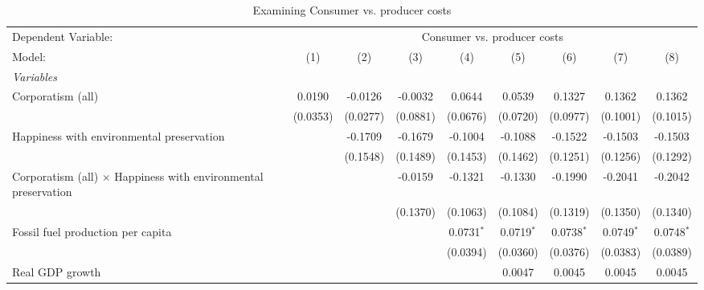 
\begin{table}[htbp]
   \caption{Examining Consumer vs. producer costs}
   \centering
   \begin{tabular}{lcccccccc}
      \tabularnewline \midrule \midrule
      Dependent Variable: & \multicolumn{8}{c}{Consumer vs. producer costs}\\
      Model:                                                                & (1)      & (2)      & (3)      & (4)          & (5)          & (6)          & (7)          & (8)\\  
      \midrule
      \emph{Variables}\\
      Corporatism (all)                                                     & 0.0190   & -0.0126  & -0.0032  & 0.0644       & 0.0539       & 0.1327       & 0.1362       & 0.1362\\   
                                                                            & (0.0353) & (0.0277) & (0.0881) & (0.0676)     & (0.0720)     & (0.0977)     & (0.1001)     & (0.1015)\\   
      Happiness with environmental preservation                             &          & -0.1709  & -0.1679  & -0.1004      & -0.1088      & -0.1522      & -0.1503      & -0.1503\\   
                                                                            &          & (0.1548) & (0.1489) & (0.1453)     & (0.1462)     & (0.1251)     & (0.1256)     & (0.1292)\\   
      Corporatism (all) $\times$ Happiness with environmental preservation  &          &          & -0.0159  & -0.1321      & -0.1330      & -0.1990      & -0.2041      & -0.2042\\   
                                                                            &          &          & (0.1370) & (0.1063)     & (0.1084)     & (0.1319)     & (0.1350)     & (0.1340)\\   
      Fossil fuel production per capita                                     &          &          &          & 0.0731$^{*}$ & 0.0719$^{*}$ & 0.0738$^{*}$ & 0.0749$^{*}$ & 0.0748$^{*}$\\   
                                                                            &          &          &          & (0.0394)     & (0.0360)     & (0.0376)     & (0.0383)     & (0.0389)\\   
      Real GDP growth                                                       &          &          &          &              & 0.0047       & 0.0045       & 0.0045       & 0.0045\\   

\end{tabular}
\end{table}
